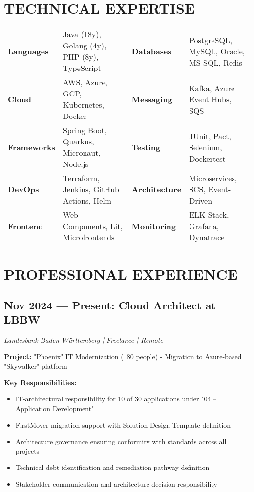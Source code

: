 \documentclass[10pt,a4paper]{article}
\newenvironment{compactlist}{\begin{itemize}[leftmargin=1em,itemsep=0pt,parsep=0pt,topsep=0pt,partopsep=0pt]}{\end{itemize}}
\begin{document}
\section{TECHNICAL EXPERTISE}

\begin{tabularx}{\textwidth}{lXlX}
\textbf{Languages} & Java (18y), Golang (4y), PHP (8y), TypeScript & \textbf{Databases} & PostgreSQL, MySQL, Oracle, MS-SQL, Redis \\
\textbf{Cloud} & AWS, Azure, GCP, Kubernetes, Docker & \textbf{Messaging} & Kafka, Azure Event Hubs, SQS \\
\textbf{Frameworks} & Spring Boot, Quarkus, Micronaut, Node.js & \textbf{Testing} & JUnit, Pact, Selenium, Dockertest \\
\textbf{DevOps} & Terraform, Jenkins, GitHub Actions, Helm & \textbf{Architecture} & Microservices, SCS, Event-Driven \\
\textbf{Frontend} & Web Components, Lit, Microfrontends & \textbf{Monitoring} & ELK Stack, Grafana, Dynatrace \\
\end{tabularx}

\newpage

\section{PROFESSIONAL EXPERIENCE}

\subsection{Nov 2024 — Present: Cloud Architect at LBBW}
\textit{Landesbank Baden-Württemberg | Freelance | Remote}

\textbf{Project:} "Phoenix" IT Modernization (~80 people) - Migration to Azure-based "Skywalker" platform

\textbf{Key Responsibilities:}
\begin{compactlist}
\item IT-architectural responsibility for 10 of 30 applications under "04 – Application Development"
\item FirstMover migration support with Solution Design Template definition
\item Architecture governance ensuring conformity with standards across all projects
\item Technical debt identification and remediation pathway definition
\item Stakeholder communication and architecture decision responsibility
\end{compactlist}
\end{document}
